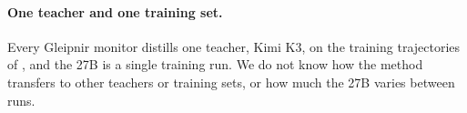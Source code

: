 \paragraph{One teacher and one training set.}
Every Gleipnir monitor distills one teacher, Kimi K3, on the training trajectories of \citet{sinha2026training}, and the 27B is a single training run.
We do not know how the method transfers to other teachers or training sets, or how much the 27B varies between runs.
